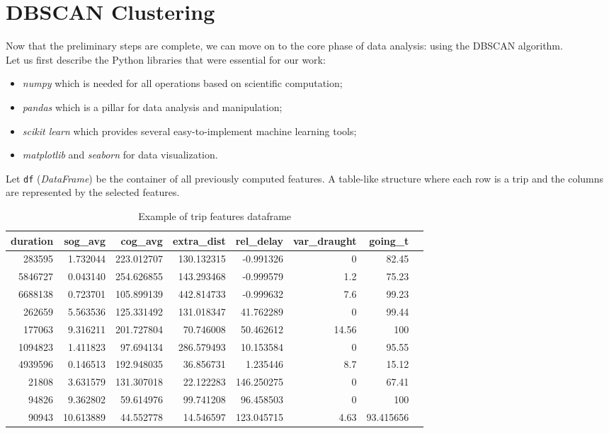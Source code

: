\clearpage

\clearpage

\section{DBSCAN Clustering}
\label{sec:clustering}

Now that the preliminary steps are complete, we can move on to the core phase of data analysis: \clustering using the DBSCAN algorithm.
\\
Let us first describe the Python libraries that were essential for our work:
\begin{itemize}
\item \textit{numpy} \cite{numpy} which is needed for all operations based on scientific computation;
\item \textit{pandas} \cite{pandas} which is a pillar for data analysis and manipulation;
\item \textit{scikit learn} \cite{sklearn} which provides several easy-to-implement machine learning tools;
\item \textit{matplotlib} \cite{matplotlib} and \textit{seaborn} \cite{seaborn} for data visualization.
\end{itemize}

Let \verb|df| (\textit{DataFrame}) be the container of all previously computed features. A table-like structure where each row is a trip and the columns are represented by the selected features.

\begin{table}[H]
\centering
\begin{tabular}{|r|r|r|r|r|r|r|r|}
\hline
\textbf{duration} & \textbf{sog\_avg} & \textbf{cog\_avg} & \textbf{extra\_dist} & \textbf{rel\_delay} & \textbf{var\_draught} & \textbf{going\_t} \\
\hline
283595 & 1.732044 & 223.012707 & 130.132315 & -0.991326 & 0 & 82.45 \\
5846727 & 0.043140 & 254.626855 & 143.293468 & -0.999579 & 1.2 & 75.23 \\
6688138 & 0.723701 & 105.899139 & 442.814733 & -0.999632 & 7.6 & 99.23 \\
262659 & 5.563536 & 125.331492 & 131.018347 & 41.762289 & 0 & 99.44 \\
177063 & 9.316211 & 201.727804 & 70.746008 & 50.462612 & 14.56 & 100 \\
1094823 & 1.411823 & 97.694134 & 286.579493 & 10.153584 & 0 & 95.55 \\
4939596 & 0.146513 & 192.948035 & 36.856731 & 1.235446 & 8.7 & 15.12 \\
21808 & 3.631579 & 131.307018 & 22.122283 & 146.250275 & 0 & 67.41 \\
94826 & 9.362802 & 59.614976 & 99.741208 & 96.458503 & 0 & 100 \\
90943 & 10.613889 & 44.552778 & 14.546597 & 123.045715 & 4.63 & 93.415656 \\
\hline
\end{tabular}
\caption{Example of trip features dataframe}
\end{table}

